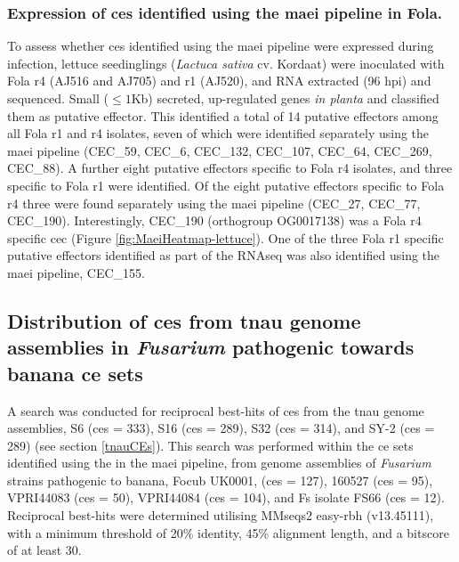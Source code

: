 \subsubsection{Expression of \aclp{ce} identified using the \ac{maei} pipeline in \acl{Fola}.}

To assess whether \acp{ce} identified using the \ac{maei} pipeline were expressed during infection, lettuce seedinglings (\textit{Lactuca sativa} cv. Kordaat) were inoculated with \ac{Fola} \ac{r4} (AJ516 and AJ705) and \ac{r1} (AJ520), and RNA extracted (96 \ac{hpi}) and sequenced. Small ($ \leq1$Kb) secreted,
up-regulated genes \textit{in planta} and classified them as putative effector. This identified a total of 14 putative effectors among all  \ac{Fola} \ac{r1} and \ac{r4} isolates, seven of which  were identified separately using the \ac{maei} pipeline (CEC\_59, CEC\_6, CEC\_132, CEC\_107, CEC\_64, CEC\_269, CEC\_88). A further eight putative effectors specific to \ac{Fola} \ac{r4} isolates, and three specific to \ac{Fola} \ac{r1} were identified. Of the eight putative effectors specific to \ac{Fola} \ac{r4} three were found separately using the \ac{maei} pipeline (CEC\_27, CEC\_77, CEC\_190). Interestingly, CEC\_190 (orthogroup OG0017138) was a \ac{Fola} \ac{r4} specific \ac{cec} (Figure \ref{fig:MaeiHeatmap-lettuce}). One of the three \ac{Fola} \ac{r1} specific putative effectors identified as part of the RNAseq was also identified using the \ac{maei} pipeline, CEC\_155. 

\subsection{Distribution of \aclp{ce} from \ac{tnau} genome assemblies in \textit{Fusarium} pathogenic towards banana \ac{ce} sets}

A search was conducted for reciprocal best-hits of \acp{ce} from the \ac{tnau} genome assemblies, S6 (\acp{ce} = 333), S16  (\acp{ce} = 289), S32 (\acp{ce} = 314), and SY-2 (\acp{ce} = 289) (see section \ref{tnauCEs}). This search was performed within the \ac{ce} sets identified using the in the \ac{maei} pipeline, from genome assemblies of \textit{Fusarium} strains pathogenic to banana, \ac{Focub} UK0001, (\acp{ce} = 127), 160527 (\acp{ce} = 95), VPRI44083 (\acp{ce} = 50), VPRI44084 (\acp{ce} = 104), and \ac{Fs} isolate FS66 (\acp{ce} = 12). Reciprocal best-hits were determined utilising MMseqs2 easy-rbh (v13.45111), with a minimum threshold of 20\% identity, 45\% alignment length, and a bitscore of at least 30. 


